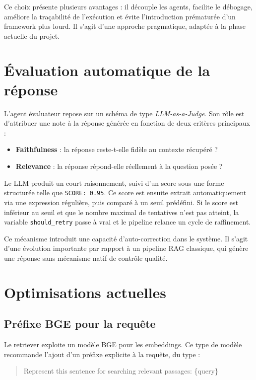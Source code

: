 \documentclass[12pt,a4paper]{report}
\begin{document}
Ce choix présente plusieurs avantages : il découple les agents, facilite le débogage, améliore la traçabilité de l'exécution et évite l'introduction prématurée d'un framework plus lourd. Il s'agit d'une approche pragmatique, adaptée à la phase actuelle du projet.

\section{Évaluation automatique de la réponse}

L'agent évaluateur repose sur un schéma de type \textit{LLM-as-a-Judge}. Son rôle est d'attribuer une note à la réponse générée en fonction de deux critères principaux :

\begin{itemize}[leftmargin=1.2cm]
  \item \textbf{Faithfulness} : la réponse reste-t-elle fidèle au contexte récupéré ?
  \item \textbf{Relevance} : la réponse répond-elle réellement à la question posée ?
\end{itemize}

Le LLM produit un court raisonnement, suivi d'un score sous une forme structurée telle que \texttt{SCORE: 0.95}. Ce score est ensuite extrait automatiquement via une expression régulière, puis comparé à un seuil prédéfini. Si le score est inférieur au seuil et que le nombre maximal de tentatives n'est pas atteint, la variable \texttt{should\_retry} passe à vrai et le pipeline relance un cycle de raffinement.

Ce mécanisme introduit une capacité d'auto-correction dans le système. Il s'agit d'une évolution importante par rapport à un pipeline RAG classique, qui génère une réponse sans mécanisme natif de contrôle qualité.

\section{Optimisations actuelles}

\subsection{Préfixe BGE pour la requête}

Le retriever exploite un modèle BGE pour les embeddings. Ce type de modèle recommande l'ajout d'un préfixe explicite à la requête, du type :

\begin{quote}
Represent this sentence for searching relevant passages: \{query\}
\end{quote}
\end{document}

